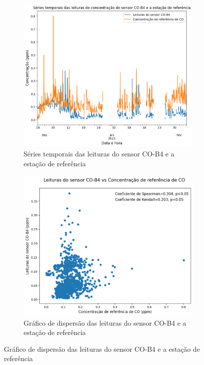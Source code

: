 \begin{figure}[h]
    \centering
    \caption{Séries temporais e gráficos de dispersão das medições de \acrshort{co}}
    \begin{subfigure}{0.495\textwidth}
        \includegraphics[width=\textwidth]{chapters/3-RESULTADOS CAMPO/Figuras/co-b4-reference-time-series.png}
        \caption{Séries temporais das leituras do sensor CO-B4 e a estação de referência}
        \label{fig:data-co-reference-time-series}
    \end{subfigure}
    \hfill
    \begin{subfigure}{0.495\textwidth}
        \includegraphics[width=\textwidth]{chapters/3-RESULTADOS CAMPO/Figuras/co-b4-reference-correlation.png}
        \caption{Gráfico de dispersão das leituras do sensor CO-B4 e a estação de referência}
        \label{fig:data-co-reference-corr}
    \end{subfigure}
\end{figure}

